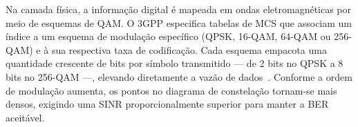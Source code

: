 Na camada física, a informação digital é mapeada em ondas eletromagnéticas por meio de esquemas de \gls{QAM}. O \gls{3GPP} especifica tabelas de \gls{MCS} que associam um índice a um esquema de modulação específico (QPSK, 16-QAM, 64-QAM ou 256-QAM) e à sua respectiva taxa de codificação. Cada esquema empacota uma quantidade crescente de bits por símbolo transmitido --- de 2 bits no QPSK a 8 bits no 256-QAM ---, elevando diretamente a vazão de dados~\cite{cox2025}. Conforme a ordem de modulação aumenta, os pontos no diagrama de constelação tornam-se mais densos, exigindo uma \gls{SINR} proporcionalmente superior para manter a \gls{BER} aceitável.





